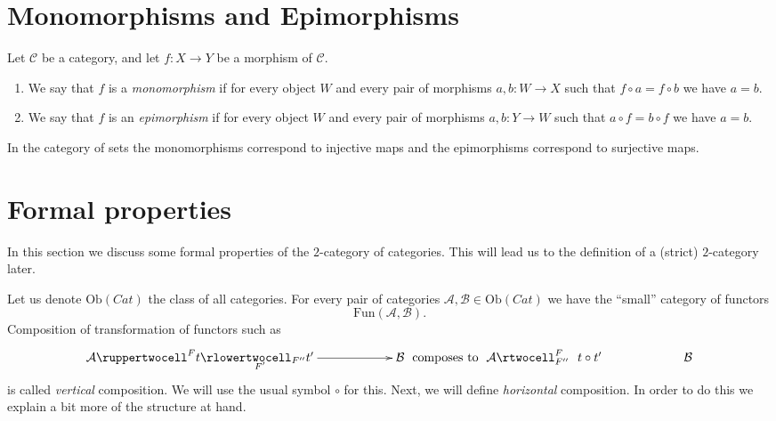 \section{Monomorphisms and Epimorphisms}
\label{section-mono-epi}

\begin{definition}
\label{definition-mono-epi}
Let $\mathcal{C}$ be a category, and let $f : X \to Y$ be
a morphism of $\mathcal{C}$.
\begin{enumerate}
\item We say that $f$ is a {\it monomorphism} if for every object
$W$ and every pair of morphisms $a, b : W \to X$ such that
$f \circ a = f \circ b$ we have $a = b$.
\item We say that $f$ is an {\it epimorphism} if for every object
$W$ and every pair of morphisms $a, b : Y \to W$ such that
$a \circ f = b \circ f$ we have $a = b$.
\end{enumerate}
\end{definition}

\begin{example}
\label{example-mono-epi-sets}
In the category of sets the monomorphisms correspond to injective
maps and the epimorphisms correspond to surjective maps.
\end{example}



\section{Formal properties}
\label{section-formal-cat-cat}

\noindent
In this section we discuss some formal properties of the
$2$-category of categories. This will lead us to the definition
of a (strict) $2$-category later.

\medskip\noindent
Let us denote $\text{Ob}(\textit{Cat})$ the class of all categories.
For every pair of categories
$\mathcal{A}, \mathcal{B} \in \text{Ob}(\textit{Cat})$
we have the ``small'' category of functors
$$
\text{Fun}(\mathcal{A}, \mathcal{B}).
$$
Composition of transformation of functors such as
$$
\xymatrixcolsep{5pc}
\xymatrix{
\mathcal{A}
\ruppertwocell^F{t}
\ar[r]_(.3){F'}
\rlowertwocell_{F''}{t'}
&
\mathcal{B}
}
\text{ composes to }
\xymatrix{
\mathcal{A}
\rtwocell^F_{F''}{\ \ t \circ t'}
&
\mathcal{B}
}
$$
is called {\it vertical} composition. We will use the usual
symbol $\circ$ for this. Next, we will define {\it horizontal}
composition. In order to do this we explain a bit more 
of the structure at hand.

